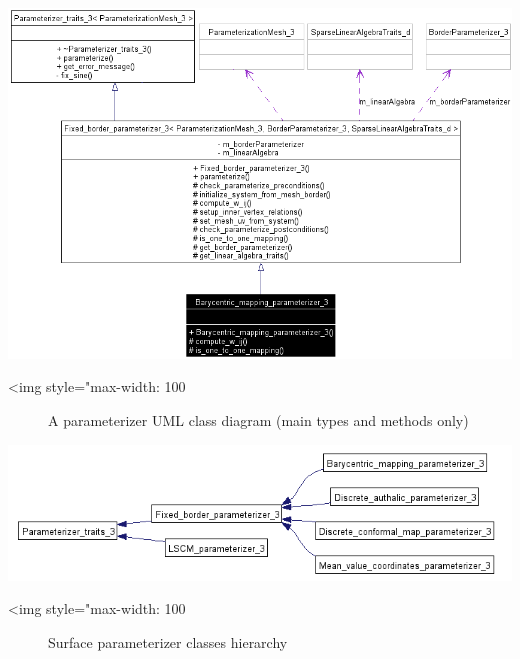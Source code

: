 \begin{center}
    \label{Surface_mesh_parameterization-fig-parameterizer_class_diagram}
    \begin{ccTexOnly}
        \includegraphics[width=1.0\textwidth]{Surface_mesh_parameterization/parameterizer_class_diagram}
    \end{ccTexOnly}
    \begin{ccHtmlOnly}
        <img style="max-width: 100%
    \end{ccHtmlOnly}
    \begin{figure}[h]
        \caption{A parameterizer UML class diagram (main types and methods only)}
    \end{figure}
\end{center}

\begin{center}
    \label{Surface_mesh_parameterization-fig-parameterizers_class_hierarchy}
    \begin{ccTexOnly}
        \includegraphics[width=1.0\textwidth]{Surface_mesh_parameterization/parameterizers_class_hierarchy}
    \end{ccTexOnly}
    \begin{ccHtmlOnly}
        <img style="max-width: 100%
    \end{ccHtmlOnly}
    \begin{figure}[h]
        \caption{Surface parameterizer classes hierarchy}
    \end{figure}
\end{center}

